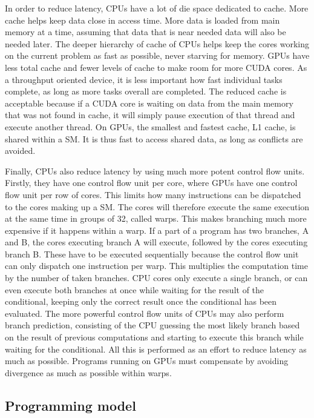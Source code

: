 In order to reduce latency, CPUs have a lot of die space dedicated to cache. More cache helps keep
data close in access time. More data is loaded from main memory at a time, assuming that data that
is near needed data will also be needed later. The deeper hierarchy of cache of CPUs helps keep the
cores working on the current problem as fast as possible, never starving for memory. GPUs have less
total cache and fewer levels of cache to make room for more CUDA cores. As a throughput oriented
device, it is less important how fast individual tasks complete, as long as more tasks overall are
completed. The reduced cache is acceptable because if a CUDA core is waiting on data from the main
memory that was not found in cache, it will simply pause execution of that thread and execute
another thread. On GPUs, the smallest and fastest cache, L1 cache, is shared within a SM. It is thus
fast to access shared data, as long as conflicts are avoided.

Finally, CPUs also reduce latency by using much more potent control flow units. Firstly, they have
one control flow unit per core, where GPUs have one control flow unit per row of cores. This limits
how many instructions can be dispatched to the cores making up a SM. The cores will therefore
execute the same execution at the same time in groups of 32, called warps. This makes branching much
more expensive if it happens within a warp. If a part of a program has two branches, A and B, the
cores executing branch A will execute, followed by the cores executing branch B. These have to be
executed sequentially because the control flow unit can only dispatch one instruction per warp. This
multiplies the computation time by the number of taken branches. CPU cores only execute a single
branch, or can even execute both branches at once while waiting for the result of the conditional,
keeping only the correct result once the conditional has been evaluated. The more powerful control
flow units of CPUs may also perform branch prediction, consisting of the CPU guessing the most
likely branch based on the result of previous computations and starting to execute this branch while
waiting for the conditional. All this is performed as an effort to reduce latency as much as
possible. Programs running on GPUs must compensate by avoiding divergence as much as possible within
warps.

\subsection{Programming model} \label{subsection:graphics_processing_units:architecture:programming_model}

